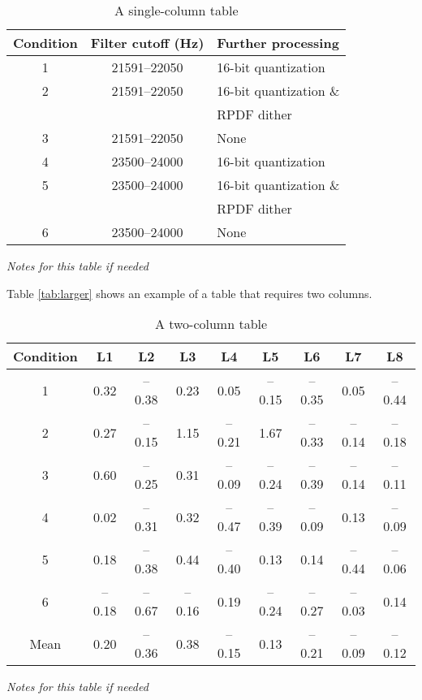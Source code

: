 \documentclass[paper=a4,fontsize=11pt,twocolumn]{article}
\begin{document}
\begin{table}
\begin{centering}
\caption{A single-column table}\label{tab:one-column}
	\begin{tabular}[\columnwidth]{ccl}\toprule
		Condition &  Filter cutoff (Hz) &  Further processing \\
		\midrule
		1  & 21591--22050 & 16-bit quantization \\
		2  & 21591--22050 & 16-bit quantization \& \\
		 & & \hspace{8.1pt}RPDF dither \\
		3  & 21591--22050 & None \\
		4  & 23500--24000 & 16-bit quantization \\
		5  & 23500--24000 & 16-bit quantization \& \\
		 & & \hspace{8.1pt}RPDF dither \\
		6  & 23500--24000 & None \\
		\bottomrule
	\end{tabular}\par
	\medskip
\textit{Notes for this table if needed}
\end{centering}
\end{table}

Table \ref{tab:larger} shows an example of a table that requires two columns.

\begin{table*}
\begin{centering}
\caption{A two-column table}\label{tab:two-column}%
	\begin{tabular}[\columnwidth]{ccccccccc}\toprule
	Condition & L1 & L2 & L3 & L4 & L5 & L6 & L7 & L8 \\
	\midrule
	1 & 0.32 & --0.38 & 0.23 & 0.05 & --0.15 & --0.35 & 0.05 & --0.44 \\
	2 & 0.27 & --0.15 & 1.15 & --0.21 & 1.67 & --0.33 & --0.14 & --0.18 \\
	3 & 0.60 & --0.25 & 0.31 & --0.09 & --0.24 & --0.39 & --0.14 & --0.11 \\
	4 & 0.02 & --0.31 & 0.32 & --0.47 & --0.39 & --0.09 & 0.13 & --0.09 \\
	5 & 0.18 & --0.38 & 0.44 & --0.40 & 0.13 & 0.14 & --0.44 & --0.06 \\
	6 & --0.18 & --0.67 & --0.16 & 0.19 & --0.24 & --0.27 & --0.03 & 0.14 \\
	\cmidrule{2-9}
	Mean & 0.20 & --0.36 & 0.38 & --0.15 & 0.13 & --0.21 & --0.09 & --0.12 \\
	\bottomrule
	\end{tabular}\par
	\medskip
\textit{Notes for this table if needed}
\end{centering}
\end{table*}
\end{document}
